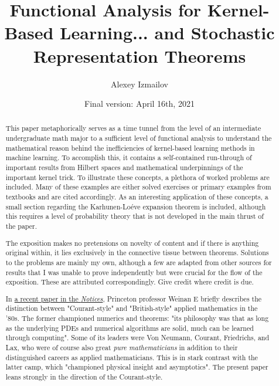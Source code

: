 \documentclass[psamsfonts]{amsart}
\title{Functional Analysis for Kernel-Based Learning... and Stochastic Representation Theorems}
\author{Alexey Izmailov}
\date{Final version: April 16th, 2021}
\theoremstyle{definition}
\theoremstyle{remark}
\numberwithin{equation}{section}
\begin{document}
\begin{abstract}
This paper metaphorically serves as a time tunnel from the level of an intermediate undergraduate math major to a sufficient level of functional analysis to understand the mathematical reason behind the inefficiencies of kernel-based learning methods in machine learning. To accomplish this, it contains a self-contained run-through of important results from Hilbert spaces and mathematical underpinnings of the important kernel trick. To illustrate these concepts, a plethora of worked problems are included. Many of these examples are either solved exercises or primary examples from textbooks and are cited accordingly. As an interesting application of these concepts, a small section regarding the Karhunen-Lo\'{e}ve expansion theorem is included, although this requires a level of probability theory that is not developed in the main thrust of the paper. 

The exposition makes no pretensions on novelty of content and if there is anything original within, it lies exclusively in the connective tissue between theorems. Solutions to the problems are mainly my own, although a few are adapted from other sources for results that I was unable to prove independently but were crucial for the flow of the exposition. These are attributed correspondingly. Give credit where credit is due. 

In \href{https://www.ams.org/journals/notices/202104/rnoti-p565.pdf}{a recent paper in the \textit{Notices}}, Princeton professor Weinan E briefly describes the distinction between "Courant-style" and "British-style" applied mathematics in the '80s. The former championed numerics and theorems: "its philosophy was that as long as the underlying PDEs and numerical algorithms are solid, much can be learned through computing". Some of its leaders were Von Neumann, Courant, Friedrichs, and Lax, who were of course also great \textit{pure mathematicians} in addition to their distinguished careers as applied mathematicians. This is in stark contrast with the latter camp, which "championed physical insight and asymptotics". The present paper leans strongly in the direction of the Courant-style. 
\end{abstract}



\maketitle
\pagebreak
\tableofcontents
\pagebreak
\end{document}
